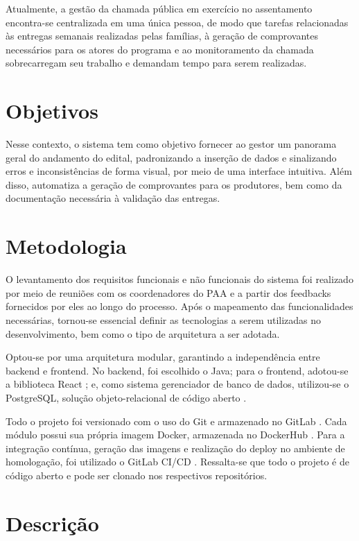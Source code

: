 Atualmente, a gestão da chamada pública em exercício no assentamento encontra-se centralizada em uma única pessoa, de modo que tarefas relacionadas às entregas semanais realizadas pelas famílias, à geração de comprovantes necessários para os atores do programa e ao monitoramento da chamada sobrecarregam seu trabalho e demandam tempo para serem realizadas.

\section{Objetivos}

Nesse contexto, o sistema tem como objetivo fornecer ao gestor um panorama geral do andamento do edital, padronizando a inserção de dados e sinalizando erros e inconsistências de forma visual, por meio de uma interface intuitiva. Além disso, automatiza a geração de comprovantes para os produtores, bem como da documentação necessária à validação das entregas.

\section{Metodologia}

O levantamento dos requisitos funcionais e não funcionais do sistema foi realizado por meio de reuniões com os coordenadores do PAA e a partir dos feedbacks fornecidos por eles ao longo do processo. Após o mapeamento das funcionalidades necessárias, tornou-se essencial definir as tecnologias a serem utilizadas no desenvolvimento, bem como o tipo de arquitetura a ser adotada.

Optou-se por uma arquitetura modular, garantindo a independência entre backend e frontend. No backend, foi escolhido o Java; para o frontend, adotou-se a biblioteca React \cite{react2026}; e, como sistema gerenciador de banco de dados, utilizou-se o PostgreSQL, solução objeto-relacional de código aberto \cite{postgresql2026}.

Todo o projeto foi versionado com o uso do Git e armazenado no GitLab \cite{chacon2014,gitlab2026}. Cada módulo possui sua própria imagem Docker, armazenada no DockerHub \cite{docker2026,dockerhub2026}. Para a integração contínua, geração das imagens e realização do deploy no ambiente de homologação, foi utilizado o GitLab CI/CD \cite{gitlabcicd2026}. Ressalta-se que todo o projeto é de código aberto e pode ser clonado nos respectivos repositórios.


\section{Descrição}


